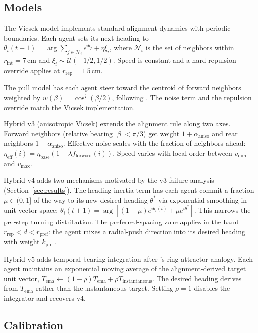 \documentclass[11pt]{article}
\begin{document}
\subsection{Models}

The Vicsek model implements standard alignment dynamics with periodic
boundaries. Each agent sets its next heading to
$\theta_i(t{+}1) = \arg\!\sum_{j \in \mathcal{N}_i}
e^{i\theta_j} + \eta \xi_i$, where $\mathcal{N}_i$ is the set of
neighbors within $r_\text{int} = 7\,$cm and $\xi_i \sim
\mathcal{U}(-1/2, 1/2)$. Speed is constant and a hard repulsion override
applies at $r_\text{rep} = 1.5\,$cm.

The pull model has each agent steer toward the centroid of forward
neighbors weighted by $w(\beta) = \cos^2(\beta/2)$, following
\citet{sayin2025}. The noise term and the repulsion override match the
Vicsek implementation.

Hybrid v3 (anisotropic Vicsek) extends the alignment rule along two
axes. Forward neighbors (relative bearing $|\beta| < \pi/3$) get
weight $1 + \alpha_\text{aniso}$ and rear neighbors $1 -
\alpha_\text{aniso}$. Effective noise scales with the fraction of
neighbors ahead: $\eta_\text{eff}(i) = \eta_\text{base} (1 - \lambda
f_\text{forward}(i))$. Speed varies with local order between
$v_\text{min}$ and $v_\text{max}$.

Hybrid v4 adds two mechanisms motivated by the v3 failure analysis
(Section~\ref{sec:results}). The heading-inertia term has each agent
commit a fraction $\mu \in (0, 1]$ of the way to its new desired
heading $\theta^*$ via exponential smoothing in unit-vector space:
$\theta_{i}(t{+}1) = \arg\!\left[(1{-}\mu) e^{i\theta_i(t)} + \mu
e^{i\theta^*}\right]$. This narrows the per-step turning distribution.
The preferred-spacing zone applies in the band $r_\text{rep} < d <
r_\text{pref}$: the agent mixes a radial-push direction into its
desired heading with weight $k_\text{pref}$.

Hybrid v5 adds temporal bearing integration after \citet{sayin2025}'s
ring-attractor analogy. Each agent maintains an exponential moving
average of the alignment-derived target unit vector, $T_\text{ema}
\leftarrow (1-\rho) T_\text{ema} + \rho T_\text{instantaneous}$. The
desired heading derives from $T_\text{ema}$ rather than the
instantaneous target. Setting $\rho = 1$ disables the integrator and
recovers v4.

\subsection{Calibration}
\end{document}

